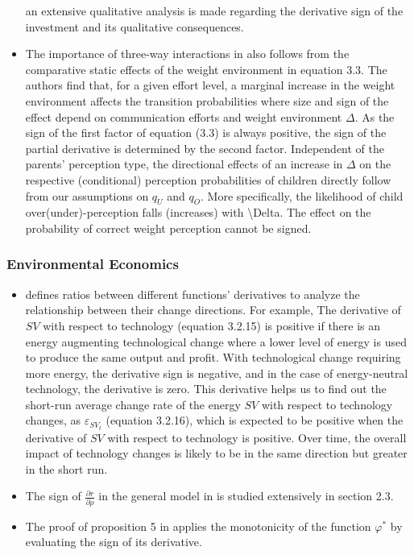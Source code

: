 \documentclass[11pt]{book}
\begin{document}
\begin{itemize}
an extensive qualitative analysis is made regarding the derivative
sign of the investment and its qualitative consequences.
\item The importance of three-way interactions in \cite{kucher2019health}
also follows from the comparative static effects of the weight environment
in equation 3.3. The authors find that, for a given effort level,
a marginal increase in the weight environment affects the transition
probabilities where size and sign of the effect depend on communication
efforts and weight environment $\Delta$. As the sign of the first
factor of equation (3.3) is always positive, the sign of the partial
derivative is determined by the second factor. Independent of the
parents' perception type, the directional effects of an increase in
$\Delta$ on the respective (conditional) perception probabilities
of children directly follow from our assumptions on $q_{U}$ and $q_{O}$.
More specifically, the likelihood of child over(under)-perception
falls (increases) with \textbackslash Delta. The effect on the probability
of correct weight perception cannot be signed.
\end{itemize}
\subsubsection{Environmental Economics}
\begin{itemize}
\item \cite{khademvatani2009measuring}
defines ratios between different functions' derivatives to analyze
the relationship between their change directions. For example, The
derivative of $SV$ with respect to technology (equation 3.2.15) is
positive if there is an energy augmenting technological change where
a lower level of energy is used to produce the same output and profit.
With technological change requiring more energy, the derivative sign
is negative, and in the case of energy-neutral technology, the derivative
is zero. This derivative helps us to find out the short-run average
change rate of the energy $SV$ with respect to technology changes,
as $\varepsilon_{SV_{t}}$ (equation 3.2.16), which is expected to
be positive when the derivative of $SV$ with respect to technology
is positive. Over time, the overall impact of technology changes is
likely to be in the same direction but greater in the short run.
\item The sign of $\frac{\partial r}{\partial\rho}$ in the general model
in \cite{jeon2014three} is studied
extensively in section 2.3.
\item The proof of proposition 5 in \cite{bell2018three}
applies the monotonicity of the function $\varphi^{*}$ by evaluating
the sign of its derivative.
\end{itemize}
\end{document}
